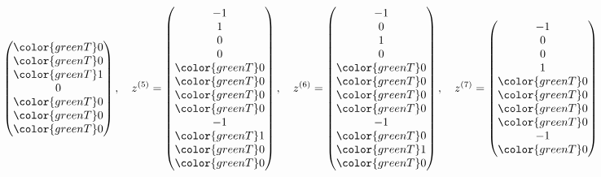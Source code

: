 \begin{loesung}
\[\begin{pmatrix}
\color{greenT} 0\\
\color{greenT} 0\\
\color{greenT} 1\\
              0\\
\color{greenT} 0\\
\color{greenT} 0\\
\color{greenT} 0
\end{pmatrix}
,\quad
z^{(5)}=
\begin{pmatrix}
             -1\\
              1\\
              0\\
              0\\
\color{greenT} 0\\
\color{greenT} 0\\
\color{greenT} 0\\
\color{greenT} 0\\
             -1\\
\color{greenT} 1\\
\color{greenT} 0\\
\color{greenT} 0
\end{pmatrix}
,\quad
z^{(6)}=\begin{pmatrix}
             -1\\
              0\\
              1\\
              0\\
\color{greenT} 0\\
\color{greenT} 0\\
\color{greenT} 0\\
\color{greenT} 0\\
             -1\\
\color{greenT} 0\\
\color{greenT} 1\\
\color{greenT} 0
\end{pmatrix}
,\quad
z^{(7)}=\begin{pmatrix}
             -1\\
              0\\
              0\\
              1\\
\color{greenT} 0\\
\color{greenT} 0\\
\color{greenT} 0\\
\color{greenT} 0\\
             -1\\
\color{greenT} 0\\

\end{pmatrix}\]
\end{loesung}
